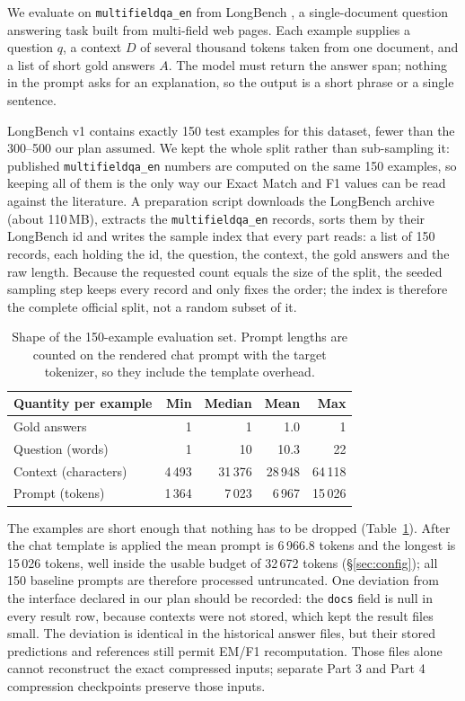 ﻿\documentclass[10pt,a4paper,twocolumn]{article}
\newcommand{\MFQA}{\texttt{multifieldqa\_\allowbreak en}}
\begin{document}
We evaluate on \MFQA{} from LongBench
\citep{bai-etal-2024-longbench}, a single-document question answering task built
from multi-field web pages. Each example supplies a question $q$, a context $D$
of several thousand tokens taken from one document, and a list of short gold
answers $A$. The model must return the answer span; nothing in the prompt asks for
an explanation, so the output is a short phrase or a single sentence.

LongBench v1 contains exactly 150 test examples for this dataset, fewer than the
300--500 our plan assumed. We kept the whole split rather than sub-sampling it:
published \MFQA{} numbers are computed on the same 150 examples, so keeping all of
them is the only way our Exact Match and F1 values can be read against the
literature. A preparation script downloads the LongBench archive (about 110\,MB),
extracts the \MFQA{} records, sorts them by their LongBench id and writes the
sample index that every part reads: a list of 150 records, each holding the id,
the question, the context, the gold answers and the raw length. Because the
requested count equals the size of the split, the seeded sampling step keeps every
record and only fixes the order; the index is therefore the complete official
split, not a random subset of it.

\begin{table}[t]
\centering
\footnotesize
\begin{tabular}{@{}lrrrr@{}}
\toprule
Quantity per example & Min & Median & Mean & Max \\
\midrule
Gold answers           & 1     & 1      & 1.0    & 1 \\
Question (words)       & 1     & 10     & 10.3   & 22 \\
Context (characters)   & 4\,493 & 31\,376 & 28\,948 & 64\,118 \\
Prompt (tokens)        & 1\,364 & 7\,023 & 6\,967 & 15\,026 \\
\bottomrule
\end{tabular}
\caption{Shape of the 150-example evaluation set. Prompt lengths are counted on
the rendered chat prompt with the target tokenizer, so they include the template
overhead.}
\label{tab:data}
\end{table}

The examples are short enough that nothing has to be dropped (Table~\ref{tab:data}).
After the chat template is applied the mean prompt is 6\,966.8 tokens and the
longest is 15\,026 tokens, well inside the usable budget of 32\,672 tokens
(\S\ref{sec:config}); all 150 baseline prompts are therefore processed
untruncated. One deviation from the interface declared in our plan should be
recorded: the \texttt{docs} field is null in every result row, because contexts
were not stored, which kept the result files small. The deviation is identical in
the historical answer files, but their stored predictions and references still permit EM/F1 recomputation. Those files alone cannot reconstruct the exact compressed inputs; separate Part 3 and Part 4 compression checkpoints preserve those inputs.
\end{document}
